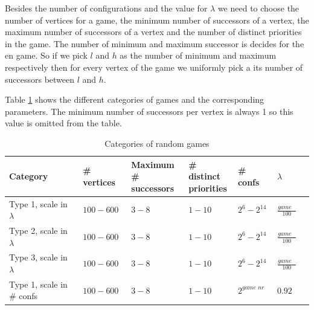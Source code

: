 Besides the number of configurations and the value for $\lambda$ we need to choose the number of vertices for a game, the minimum number of successors of a vertex, the maximum number of successors of a vertex and the number of distinct priorities in the game. The number of minimum and maximum successor is decides for the en game. So if we pick $l$ and $h$ as the number of minimum and maximum respectively then for every vertex of the game we uniformly pick a its number of successors between $l$ and $h$.

Table \ref{tab_random_games} shows the different categories of games and the corresponding parameters. The minimum number of successors per vertex is always 1 so this value is omitted from the table.

\begin{table}[]
\centering
	\begin{tabular}{|l|l|l|l|l|l|l|}
		\hline
		Category & \# vertices & \shortstack{Maximum \\\# successors} & \shortstack{\# distinct\\priorities} & \# confs  & $\lambda$ \\ \hline
		Type 1, scale in $\lambda$ & $100-600$            & $3-8$                   & $1-10$                          & $2^{6}-2^{14}$ & $\frac{\textit{game nr}}{100}$            \\ \hline
		Type 2, scale in $\lambda$ & $100-600$            & $3-8$                   & $1-10$                          & $2^{6}-2^{14}$ & $\frac{\textit{game nr}}{100}$            \\ \hline
		Type 3, scale in $\lambda$ & $100-600$            & $3-8$                   & $1-10$                          & $2^{6}-2^{14}$ & $\frac{\textit{game nr}}{100}$            \\ \hline
		Type 1, scale in \# confs          & $100-600$            &  $3-8$                   & $1-10$                          & $2^\textit{game nr}$                & $0.92$                   \\ \hline
	\end{tabular}
\caption{Categories of random games}
	\label{tab_random_games}
\end{table}
